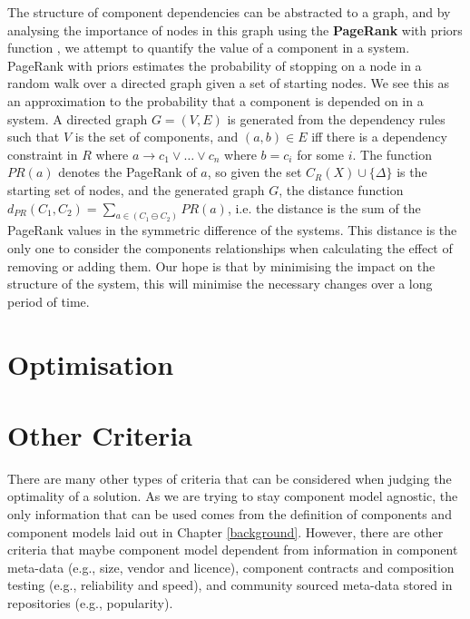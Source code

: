 The structure of component dependencies can be abstracted to a graph, 
and by analysing the importance of nodes in this graph using the \textbf{PageRank} with priors function \cite{White:2003:AER:956750.956782}, 
we attempt to quantify the value of a component in a system.
PageRank with priors estimates the probability of stopping on a node in a random walk over a directed graph given a set of starting nodes.
We see this as an approximation to the probability that a component is depended on in a system.
A directed graph $G = (V,E)$ is generated from the
dependency rules such that $V$ is the set of components, and $(a,b) \in E$ iff there is a dependency constraint in $R$ 
where $a \rightarrow c_1 \vee \ldots \vee c_n$ where $b = c_i$ for some $i$.
The function $PR(a)$ denotes the PageRank of $a$,
so given the set $C_R(X) \cup \{\Delta\}$ is the starting set of nodes, and the generated graph $G$,
the distance function $d_{PR}(C_1,C_2) = \sum_{a \in (C_1 \ominus C_2)} PR(a)$,
i.e. the distance is the sum of the PageRank values in the symmetric difference of the systems.
This distance is the only one to consider the components relationships when calculating the effect of removing or adding them.
Our hope is that by minimising the impact on the structure of the system, 
this will minimise the necessary changes over a long period of time.



\section{Optimisation}

\section{Other Criteria}
{}There are many other types of criteria that can be considered when judging the optimality of a solution.
{}As we are trying to stay component model agnostic, the only information that can be used comes from the definition of components and component models laid out in Chapter \ref{background}.
{}However, there are other criteria that maybe component model dependent from information in component meta-data (e.g., size, vendor and licence),
{}component contracts and composition testing (e.g., reliability and speed),
{}and community sourced meta-data stored in repositories (e.g., popularity).




